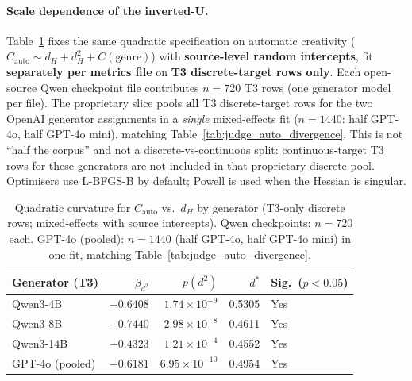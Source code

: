 \documentclass[sigconf,nonacm]{acmart}
\begin{document}
\paragraph{Scale dependence of the inverted-U.}
Table~\ref{tab:scale_regression} fixes the same quadratic specification on automatic creativity ($C_{\mathrm{auto}}\sim d_H+d_H^2+C(\mathrm{genre})$) with \textbf{source-level random intercepts}, fit \textbf{separately per metrics file} on \textbf{T3 discrete-target rows only}.
Each open-source Qwen checkpoint file contributes $n{=}720$ T3 rows (one generator model per file).
The proprietary slice pools \textbf{all} T3 discrete-target rows for the two OpenAI generator assignments in a \emph{single} mixed-effects fit ($n{=}1440$: half GPT-4o, half GPT-4o mini), matching Table~\ref{tab:judge_auto_divergence}. This is not ``half the corpus'' and not a discrete-vs-continuous split: continuous-target T3 rows for these generators are not included in that proprietary discrete pool.
Optimisers use L-BFGS-B by default; Powell is used when the Hessian is singular.

\begin{table}[t]
\centering
\small
\begin{tabular}{lrrrl}
\toprule
Generator (T3) & $\beta_{d^2}$ & $p(d^2)$ & $d^\ast$ & Sig.\ ($p{<}0.05$) \\
\midrule
Qwen3-4B & $-0.6408$ & $1.74{\times}10^{-9}$ & 0.5305 & Yes \\
Qwen3-8B & $-0.7440$ & $2.98{\times}10^{-8}$ & 0.4611 & Yes \\
Qwen3-14B & $-0.4323$ & $1.21{\times}10^{-4}$ & 0.4552 & Yes \\
GPT-4o (pooled) & $-0.6181$ & $6.95{\times}10^{-10}$ & 0.4954 & Yes \\
\bottomrule
\end{tabular}
\caption{Quadratic curvature for $C_{\mathrm{auto}}$ vs.\ $d_H$ by generator (T3-only discrete rows; mixed-effects with source intercepts). Qwen checkpoints: $n{=}720$ each. GPT-4o (pooled): $n{=}1440$ (half GPT-4o, half GPT-4o mini) in one fit, matching Table~\ref{tab:judge_auto_divergence}.}
\label{tab:scale_regression}
\end{table}
\end{document}
